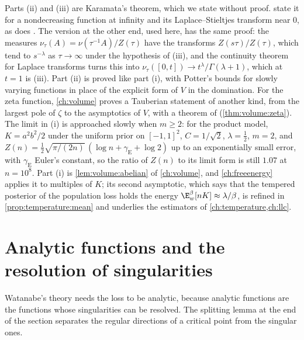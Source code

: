 \begin{refsection}
Parts (ii) and (iii) are Karamata's theorem, which we state without proof. \Textcite[Theorem~1.7.1]{BinghamEtAl1987} state it for a nondecreasing function at infinity and its Laplace--Stieltjes transform near $0$, as does \textcite[Chapter~XIII]{Feller1971}. The version at the other end, used here, has the same proof: the measures $\nu_\tau(A)=\nu(\tau^{-1}A)/Z(\tau)$ have the transforms $Z(s\tau)/Z(\tau)$, which tend to $s^{-\lambda}$ as $\tau\to\infty$ under the hypothesis of (iii), and the continuity theorem for Laplace transforms turns this into $\nu_\tau([0,t])\to t^\lambda/\Gamma(\lambda+1)$, which at $t=1$ is (iii). Part (ii) is proved like part (i), with Potter's bounds for slowly varying functions \parencite{BinghamEtAl1987} in place of the explicit form of $V$ in the domination. For the zeta function, \cref{ch:volume} proves a Tauberian statement of another kind, from the largest pole of $\zeta$ to the asymptotics of $V$, with a theorem of \textcite{Delange1954} (\cref{thm:volume:zeta}). The limit in (i) is approached slowly when $m\ge2$: for the product model, $K=a^2b^2/2$ under the uniform prior on $[-1,1]^2$, $C=1/\sqrt2$, $\lambda=\frac12$, $m=2$, and $Z(n)=\frac12\sqrt{\pi/(2n)}\,(\log n+\gamma_{\mathrm E}+\log2)$ up to an exponentially small error, with $\gamma_{\mathrm E}$ Euler's constant, so the ratio of $Z(n)$ to its limit form is still $1.07$ at $n=10^8$. Part (i) is \cref{lem:volume:abelian} of \cref{ch:volume}, and \cref{ch:freeenergy} applies it to multiples of $K$; its second asymptotic, which says that the tempered posterior of the population loss holds the energy $\E^\beta_w[nK]\approx\lambda/\beta$, is refined in \cref{prop:temperature:mean} and underlies the estimators of \cref{ch:temperature,ch:llc}.

\section{Analytic functions and the resolution of singularities}\label{sec:toolkit:singularities}

Watanabe's theory needs the loss to be analytic, because analytic functions are the functions whose singularities can be resolved. The splitting lemma at the end of the section separates the regular directions of a critical point from the singular ones.


\end{refsection}
